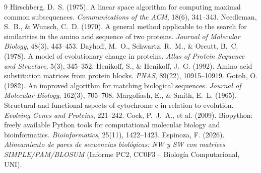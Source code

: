 \documentclass[11pt,a4paper]{article}
\begin{document}
\begin{thebibliography}{9}
 Hirschberg, D.~S. (1975). A linear space algorithm for computing maximal common subsequences. \emph{Communications of the ACM}, 18(6), 341--343.
 Needleman, S.~B., \& Wunsch, C.~D. (1970). A general method applicable to the search for similarities in the amino acid sequence of two proteins. \emph{Journal of Molecular Biology}, 48(3), 443--453.
 Dayhoff, M.~O., Schwartz, R.~M., \& Orcutt, B.~C. (1978). A model of evolutionary change in proteins. \emph{Atlas of Protein Sequence and Structure}, 5(3), 345--352.
 Henikoff, S., \& Henikoff, J.~G. (1992). Amino acid substitution matrices from protein blocks. \emph{PNAS}, 89(22), 10915--10919.
 Gotoh, O. (1982). An improved algorithm for matching biological sequences. \emph{Journal of Molecular Biology}, 162(3), 705--708.
 Margoliash, E., \& Smith, E.~L. (1965). Structural and functional aspects of cytochrome c in relation to evolution. \emph{Evolving Genes and Proteins}, 221--242.
 Cock, P.~J.~A., et al. (2009). Biopython: freely available Python tools for computational molecular biology and bioinformatics. \emph{Bioinformatics}, 25(11), 1422--1423.
 Espinoza, F. (2026). \emph{Alineamiento de pares de secuencias biol\'ogicas: NW y SW con matrices SIMPLE/PAM/BLOSUM} (Informe PC2, CC0F3 -- Biolog\'ia Computacional, UNI).
\end{thebibliography}
\end{document}
